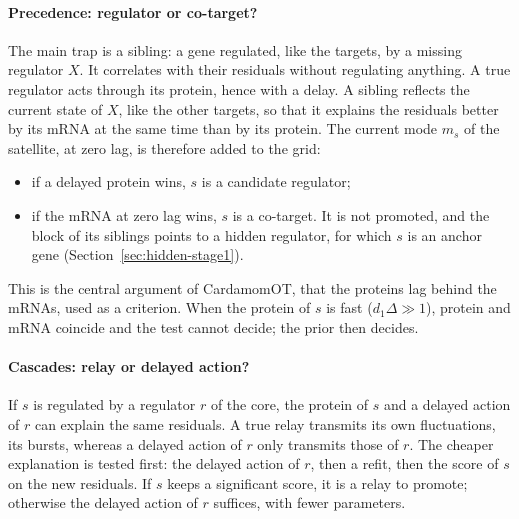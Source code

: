 \documentclass[a4paper, 11pt]{article}
\theoremstyle{plain}
\theoremstyle{remark}
\begin{document}
\paragraph{Precedence: regulator or co-target?} The main trap is a sibling: a gene regulated, like the targets, by a missing regulator $X$. It correlates with their residuals without regulating anything. A true regulator acts through its protein, hence with a delay. A sibling reflects the current state of $X$, like the other targets, so that it explains the residuals better by its mRNA at the same time than by its protein. The current mode $m_s$ of the satellite, at zero lag, is therefore added to the grid:
\begin{itemize}[nosep]
\item if a delayed protein wins, $s$ is a candidate regulator;
\item if the mRNA at zero lag wins, $s$ is a co-target. It is not promoted, and the block of its siblings points to a hidden regulator, for which $s$ is an anchor gene (Section~\ref{sec:hidden-stage1}).
\end{itemize}
This is the central argument of CardamomOT, that the proteins lag behind the mRNAs, used as a criterion. When the protein of $s$ is fast ($d_1\Delta \gg 1$), protein and mRNA coincide and the test cannot decide; the prior then decides.

\paragraph{Cascades: relay or delayed action?} If $s$ is regulated by a regulator $r$ of the core, the protein of $s$ and a delayed action of $r$ can explain the same residuals. A true relay transmits its own fluctuations, its bursts, whereas a delayed action of $r$ only transmits those of $r$. The cheaper explanation is tested first: the delayed action of $r$, then a refit, then the score of $s$ on the new residuals. If $s$ keeps a significant score, it is a relay to promote; otherwise the delayed action of $r$ suffices, with fewer parameters.
\end{document}
